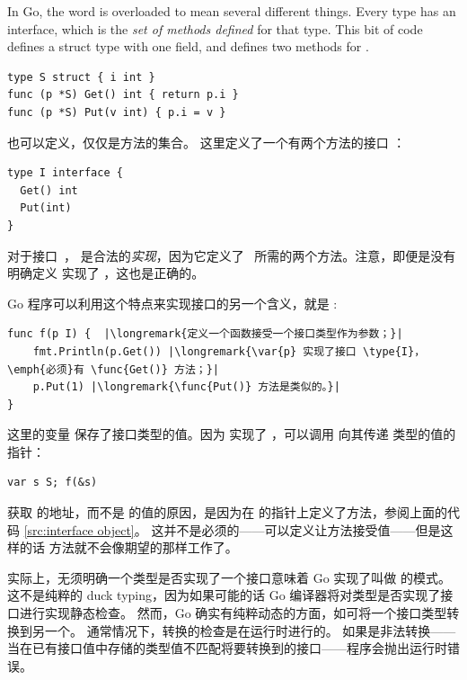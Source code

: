 

\noindent{}
In Go, the word  is overloaded to mean several different
things. Every type has an interface, which is the \emph{set of methods
defined} for 
that type. This bit of code defines a struct type  with one field, and
defines two methods for .
\begin{lstlisting}[caption=Defining a struct and methods on it,label=src:interface object]
type S struct { i int }
func (p *S) Get() int { return p.i }
func (p *S) Put(v int) { p.i = v }
\end{lstlisting}
也可以定义，仅仅是方法的集合。
这里定义了一个有两个方法的接口 ：
\begin{lstlisting}
type I interface {
  Get() int
  Put(int)
}
\end{lstlisting}

\noindent 对于接口~， 是合法的\emph{实现}，因为它定义了~
所需的两个方法。注意，即便是没有明确定义  实现了 ，这也是正确的。

Go 程序可以利用这个特点来实现接口的另一个含义，就是
:

\begin{lstlisting}
func f(p I) {  |\longremark{定义一个函数接受一个接口类型作为参数；}|
    fmt.Println(p.Get()) |\longremark{\var{p} 实现了接口 \type{I}，\emph{必须}有 \func{Get()} 方法；}|
    p.Put(1) |\longremark{\func{Put()} 方法是类似的。}|
}
\end{lstlisting}
\showremarks
这里的变量  保存了接口类型的值。因为
 实现了 ，可以调用  向其传递  类型的值的指针：
\begin{lstlisting}
var s S; f(&s)
\end{lstlisting}

获取  的地址，而不是  的值的原因，是因为在  
的指针上定义了方法，参阅上面的代码 \ref{src:interface object}。
这并不是必须的——可以定义让方法接受值——但是这样的话  方法就不会像期望的那样工作了。

实际上，无须明确一个类型是否实现了一个接口意味着 Go 实现了叫做
\cite{duck_typing} 的模式。
这不是纯粹的 duck typing，因为如果可能的话 Go 编译器将对类型是否实现了接口进行实现静态检查。
然而，Go 确实有纯粹动态的方面，如可将一个接口类型转换到另一个。
通常情况下，转换的检查是在运行时进行的。
如果是非法转换——当在已有接口值中存储的类型值不匹配将要转换到的接口——程序会抛出运行时错误。

